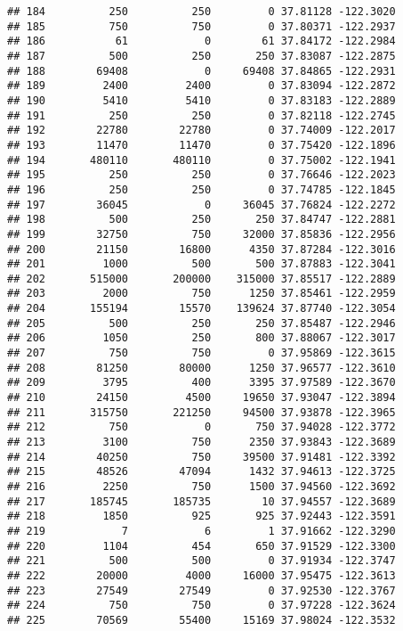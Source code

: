 \documentclass[
]{book}
\begin{document}
\begin{verbatim}
## 184          250          250         0 37.81128 -122.3020
## 185          750          750         0 37.80371 -122.2937
## 186           61            0        61 37.84172 -122.2984
## 187          500          250       250 37.83087 -122.2875
## 188        69408            0     69408 37.84865 -122.2931
## 189         2400         2400         0 37.83094 -122.2872
## 190         5410         5410         0 37.83183 -122.2889
## 191          250          250         0 37.82118 -122.2745
## 192        22780        22780         0 37.74009 -122.2017
## 193        11470        11470         0 37.75420 -122.1896
## 194       480110       480110         0 37.75002 -122.1941
## 195          250          250         0 37.76646 -122.2023
## 196          250          250         0 37.74785 -122.1845
## 197        36045            0     36045 37.76824 -122.2272
## 198          500          250       250 37.84747 -122.2881
## 199        32750          750     32000 37.85836 -122.2956
## 200        21150        16800      4350 37.87284 -122.3016
## 201         1000          500       500 37.87883 -122.3041
## 202       515000       200000    315000 37.85517 -122.2889
## 203         2000          750      1250 37.85461 -122.2959
## 204       155194        15570    139624 37.87740 -122.3054
## 205          500          250       250 37.85487 -122.2946
## 206         1050          250       800 37.88067 -122.3017
## 207          750          750         0 37.95869 -122.3615
## 208        81250        80000      1250 37.96577 -122.3610
## 209         3795          400      3395 37.97589 -122.3670
## 210        24150         4500     19650 37.93047 -122.3894
## 211       315750       221250     94500 37.93878 -122.3965
## 212          750            0       750 37.94028 -122.3772
## 213         3100          750      2350 37.93843 -122.3689
## 214        40250          750     39500 37.91481 -122.3392
## 215        48526        47094      1432 37.94613 -122.3725
## 216         2250          750      1500 37.94560 -122.3692
## 217       185745       185735        10 37.94557 -122.3689
## 218         1850          925       925 37.92443 -122.3591
## 219            7            6         1 37.91662 -122.3290
## 220         1104          454       650 37.91529 -122.3300
## 221          500          500         0 37.91934 -122.3747
## 222        20000         4000     16000 37.95475 -122.3613
## 223        27549        27549         0 37.92530 -122.3767
## 224          750          750         0 37.97228 -122.3624
## 225        70569        55400     15169 37.98024 -122.3532

\end{verbatim}
\end{document}

